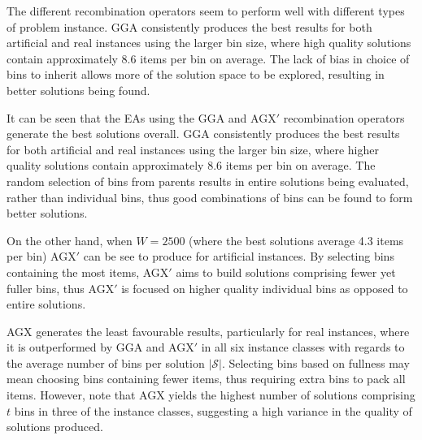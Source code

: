 \documentclass[authoryear]{elsarticle}
\begin{document}
The different recombination operators seem to perform well with different types of problem instance. GGA consistently produces the best results for both artificial and real instances using the larger bin size, where high quality solutions contain approximately 8.6 items per bin on average. The lack of bias in choice of bins to inherit allows more of the solution space to be explored, resulting in better solutions being found.

It can be seen that the EAs using the GGA and AGX$'$ recombination operators generate the best solutions overall.  GGA consistently produces the best results for both artificial and real instances using the larger bin size, where higher quality solutions contain approximately 8.6 items per bin on average.  The random selection of bins from parents results in entire solutions being evaluated, rather than individual bins, thus good combinations of bins can be found to form better solutions.

On the other hand, when $W = 2500$ (where the best solutions average 4.3 items per bin) AGX$'$ can be see to produce  for artificial instances. By selecting bins containing the most items, AGX$'$ aims to build solutions comprising fewer yet fuller bins, thus AGX$'$ is focused on higher quality individual bins as opposed to entire solutions.



AGX generates the least favourable results, particularly for real instances, where it is outperformed by GGA and AGX$'$ in all six instance classes with regards to the average number of bins per solution $|\mathcal{S}|$. Selecting bins based on fullness may mean choosing bins containing fewer items, thus requiring extra bins to pack all items. However, note that AGX yields the highest number of solutions comprising $t$ bins in three of the instance classes, suggesting a high variance in the quality of solutions produced.
\end{document}

